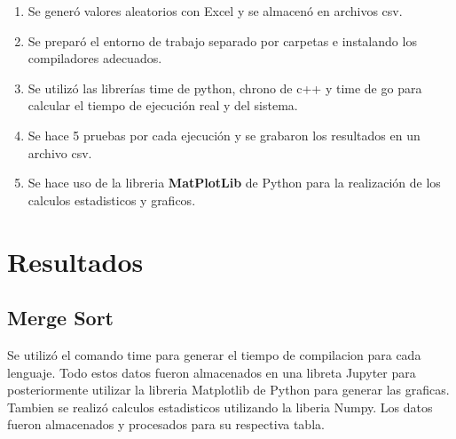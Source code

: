 \documentclass{article}
\begin{document}
	\begin{enumerate}
		\item Se generó valores aleatorios con Excel y se almacenó en archivos csv.
		\item Se preparó el entorno de trabajo separado por carpetas e instalando los compiladores adecuados.
		\item Se utilizó las librerías time de python, chrono de c++ y time de go para calcular el tiempo de ejecución real y del sistema.
		\item Se hace 5 pruebas por cada ejecución y se grabaron los resultados en un archivo csv.
		\item Se hace uso de la libreria \textbf{MatPlotLib} de Python para la realización de los calculos estadisticos y graficos.
	\end{enumerate}

\section{Resultados}
\subsection{Merge Sort} 
Se utilizó el comando time para generar el tiempo de compilacion para cada lenguaje. Todo estos datos fueron almacenados en una libreta Jupyter para posteriormente utilizar la libreria Matplotlib de Python para generar las graficas.
 Tambien se realizó calculos estadisticos utilizando la liberia Numpy. Los datos fueron almacenados y procesados para su respectiva tabla.
\end{document}
